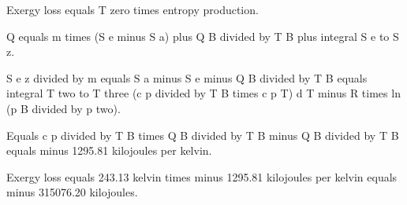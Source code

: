 Exergy loss equals T zero times entropy production.  

Q equals m times (S e minus S a) plus Q B divided by T B plus integral S e to S z.  

S e z divided by m equals S a minus S e minus Q B divided by T B equals integral T two to T three (c p divided by T B times c p T) d T minus R times ln (p B divided by p two).  

Equals c p divided by T B times Q B divided by T B minus Q B divided by T B equals minus 1295.81 kilojoules per kelvin.  

Exergy loss equals 243.13 kelvin times minus 1295.81 kilojoules per kelvin equals minus 315076.20 kilojoules.